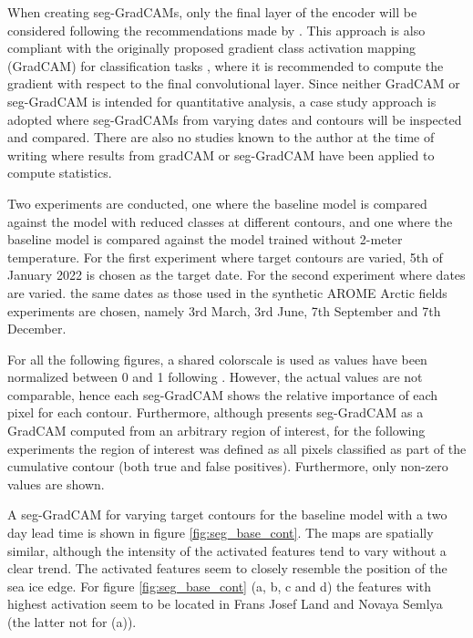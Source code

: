 \documentclass[../main/thesis.tex]{subfiles}
\begin{document}
When creating seg-GradCAMs, only the final layer of the encoder will be considered following the recommendations made by \citet{Vinogradova2020}. This approach is also compliant with the originally proposed gradient class activation mapping (GradCAM) for classification tasks \citep{Selvaraju2016}, where it is recommended to compute the gradient with respect to the final convolutional layer. Since neither GradCAM or seg-GradCAM is intended for quantitative analysis, a case study approach is adopted where seg-GradCAMs from varying dates and contours will be inspected and compared. There are also no studies known to the author at the time of writing where results from gradCAM or seg-GradCAM have been applied to compute statistics.

Two experiments are conducted, one where the baseline model is compared against the model with reduced classes at different contours, and one where the baseline model is compared against the model trained without 2-meter temperature. For the first experiment where target contours are varied, 5th of January 2022 is chosen as the target date. For the second experiment where dates are varied. the same dates as those used in the synthetic AROME Arctic fields experiments are chosen, namely 3rd March, 3rd June, 7th September and 7th December. 

For all the following figures, a shared colorscale is used as values have been normalized between 0 and 1 following \citet{Vinogradova2020}. However, the actual values are not comparable, hence each seg-GradCAM shows the relative importance of each pixel for each contour. Furthermore, although \citet{Vinogradova2020} presents seg-GradCAM as a GradCAM computed from an arbitrary region of interest, for the following experiments the region of interest was defined as all pixels classified as part of the cumulative contour (both true and false positives). Furthermore, only non-zero values are shown.

A seg-GradCAM for varying target contours for the baseline model with a two day lead time is shown in figure \ref{fig:seg_base_cont}. The maps are spatially similar, although the intensity of the activated features tend to vary without a clear trend. The activated features seem to closely resemble the position of the sea ice edge. For figure \ref{fig:seg_base_cont} (a, b, c and d) the features with highest activation seem to be located in Frans Josef Land and Novaya Semlya (the latter not for (a)). 
\end{document}
